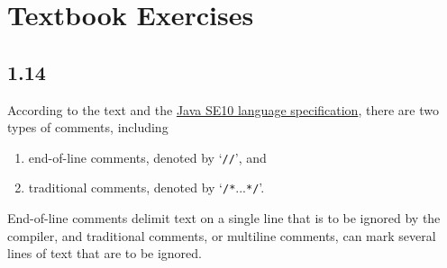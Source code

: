 \documentclass[leqno, 11pt]{article}
\begin{document}
\section*{Textbook Exercises}
\subsection*{1.14}
According to the text and the \href{https://docs.oracle.com/javase/specs/jls/se10/html/jls-3.html#jls-3.7}{Java SE10 language specification}, there are two types of comments, including
\begin{enumerate}
  \item end-of-line comments, denoted by `\texttt{//}', and
  \item traditional comments, denoted by `\texttt{/*}...\texttt{*/}'.
\end{enumerate}
End-of-line comments delimit text on a single line that is to be ignored by the compiler, and traditional comments, or multiline comments, can mark several lines of text that are to be ignored.
\end{document}
